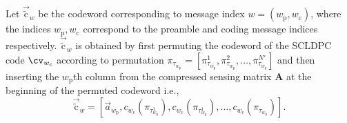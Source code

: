 \documentclass[final,onecolumn,12pt]{IEEEtran}
\begin{document}
Let $\vec{\tilde{\mathrm{c}}}_w$ be the codeword corresponding to message index $w=(w_{\mathrm{p}},w_{\mathrm{c}})$, where the indices $w_{\mathrm{p}},w_{\mathrm{c}}$ correspond to the preamble and coding message indices respectively. $\vec{\tilde{\mathrm{c}}}_w$ is obtained by first permuting the  codeword of the SCLDPC code $\cv_{w_\mathrm{c}}$ according to permutation $\pi_{\tau_{w_\mathrm{p}}}=[\pi_{\tau_{w_\mathrm{p}}}^1,\pi_{\tau_{w_\mathrm{p}}}^2,\ldots, \pi_{\tau_{w_\mathrm{p}}}^{N'}]$ and then inserting the $w_\mathrm{p}$th column from the compressed sensing matrix $\mathbf{A}$ at the beginning of the permuted codeword i.e.,
\begin{equation}\label{eqn:codeconstruction1}
  \vec{\tilde{\mathrm{c}}}_w = [\vec{a}_{w_\mathrm{p}},c_{w_\mathrm{c}}(\pi_{\tau_{w_\mathrm{p}}^1}),c_{w_\mathrm{c}}(\pi_{\tau_{w_\mathrm{p}}^1}),\ldots,c_{w_\mathrm{c}}(\pi_{\tau_{w_\mathrm{p}}})].
\end{equation}
\end{document}
